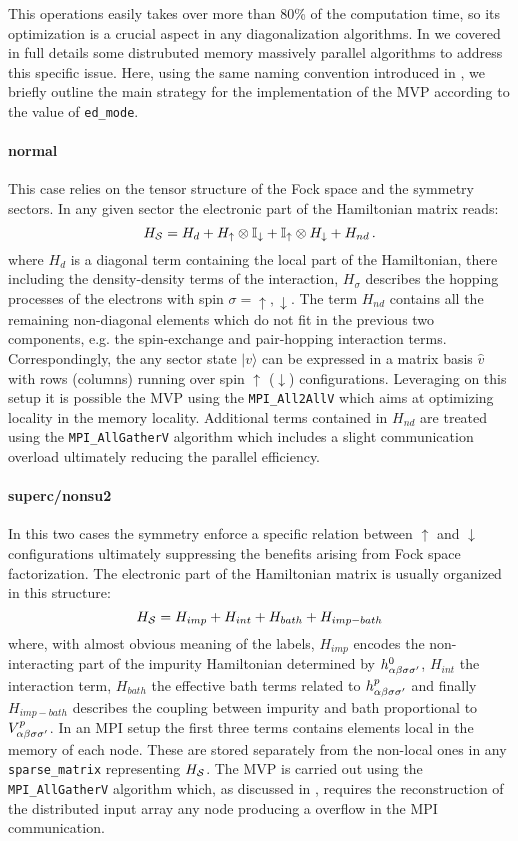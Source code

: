 \documentclass[final,3p,10pt]{elsarticle}
\newcommand{\onlinecite}[1]{\nocite{#1}\hspace{-0.1cm}\citenum{#1}}
\newcommand{\ket}[1]
{|#1\rangle}
\def\a{\alpha}       \def\b{\beta}   \def\g{\gamma}   \def\d{\delta}
\def\up{\uparrow} \def\down{\downarrow} \def\dw{\downarrow}
\begin{document}
This operations easily takes over more than 80\% of the computation
time, so its optimization is a crucial aspect in any diagonalization
algorithms. In \onlinecite{amaricci2022} we covered in full details
some distrubuted memory massively parallel algorithms to address this
specific issue.
Here, using the same naming convention introduced in \cite{amaricci}, 
we briefly outline the main strategy for the implementation of the MVP
according to the value of {\tt ed\_mode}.


\paragraph{{\bf normal}}
This case relies on the tensor structure of the Fock space and the
symmetry sectors. In any given sector the electronic part of the
Hamiltonian matrix reads:
\begin{equation}
H_\SS = H_d  + H_\up\otimes \mathbb{I}_\dw + \mathbb{I}_\up\otimes
H_\dw + H_{nd}\,.
\label{HssNormal}
\end{equation}
where $H_d$ is a diagonal term containing the local part of the
Hamiltonian, there including the density-density terms of the
interaction,  $H_\sigma$ describes the hopping processes of the
electrons with spin $\sigma=\up,\dw$.
The term $H_{nd}$ contains all the remaining non-diagonal
elements which do not fit in the previous two components,
e.g. the spin-exchange and pair-hopping interaction terms.
Correspondingly, the any sector state $\ket{v}$ can be expressed in a matrix
basis $\hat{v}$ with rows (columns) running over spin $\up$ ($\down$)
configurations. Leveraging on this setup it is possible the MVP using the 
{\tt MPI\_All2AllV} which aims at optimizing locality in the memory
locality. Additional terms contained in $H_{nd}$ are treated using the
{\tt MPI\_AllGatherV} algorithm which includes a slight communication
overload ultimately reducing the parallel efficiency.  


\paragraph{{\bf superc/nonsu2}}
In this two cases the symmetry enforce a specific relation between $\up$ and
$\dw$ configurations ultimately suppressing the benefits arising from
Fock space factorization.
The electronic part of the Hamiltonian matrix is usually organized in this structure:
$$
H_{\cal S} = H_{imp} + H_{int} + H_{bath} + H_{imp-bath} 
$$
where, with almost obvious meaning of the labels, $H_{imp}$ encodes
the non-interacting part of the impurity Hamiltonian determined by
$h^0_{\a\b\s\s'}$, $H_{int}$ the interaction term, $H_{bath}$ the
effective bath terms related to $h^p_{\a\b\s\s'}$ and finally
$H_{imp-bath}$ describes the coupling between impurity and bath
proportional to $V^p_{\a\b\s\s'}$. 
In an MPI setup the first three terms contains elements local in the
memory of each node. These are stored separately from the non-local
ones in any {\tt sparse\_matrix} representing $H_{\cal S}$. 
The MVP is carried out using the {\tt MPI\_AllGatherV} algorithm
which, as discussed in \onlinecite{amaricci2022}, requires the
reconstruction of the distributed input array any node producing a
overflow in the MPI communication.  
\end{document}
